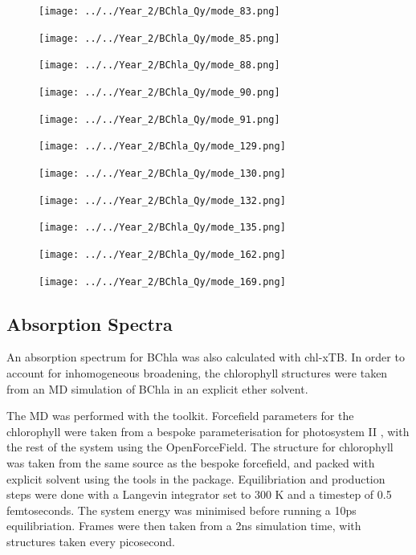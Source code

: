 \begin{figure}
    \texttt{[image: ../../Year\_2/BChla\_Qy/mode\_83.png]}
\end{figure}
\begin{figure}
    \texttt{[image: ../../Year\_2/BChla\_Qy/mode\_85.png]}
\end{figure}
\begin{figure}
    \texttt{[image: ../../Year\_2/BChla\_Qy/mode\_88.png]}
\end{figure}
\begin{figure}
    \texttt{[image: ../../Year\_2/BChla\_Qy/mode\_90.png]}
\end{figure}
\begin{figure}
    \texttt{[image: ../../Year\_2/BChla\_Qy/mode\_91.png]}
\end{figure}
\begin{figure}
    \texttt{[image: ../../Year\_2/BChla\_Qy/mode\_129.png]}
\end{figure}
\begin{figure}
    \texttt{[image: ../../Year\_2/BChla\_Qy/mode\_130.png]}
\end{figure}
\begin{figure}
    \texttt{[image: ../../Year\_2/BChla\_Qy/mode\_132.png]}
\end{figure}
\begin{figure}
    \texttt{[image: ../../Year\_2/BChla\_Qy/mode\_135.png]}
\end{figure}
\begin{figure}
    \texttt{[image: ../../Year\_2/BChla\_Qy/mode\_162.png]}
\end{figure}
\begin{figure}
    \texttt{[image: ../../Year\_2/BChla\_Qy/mode\_169.png]}
\end{figure}

\subsection{Absorption Spectra}
\label{subsec:absorption_spectra}

An absorption spectrum for BChla was also calculated with chl-xTB. In order to
account for inhomogeneous broadening, the chlorophyll structures were taken from
an MD simulation of BChla in an explicit ether solvent.

The MD was performed with the  toolkit. Forcefield parameters for the
chlorophyll were taken from a bespoke parameterisation for photosystem II \cite{Zhang2012},
with the rest of the system using the OpenForceField. The structure for chlorophyll 
was taken from the same source as the bespoke forcefield, and packed with explicit
solvent using the tools in the  package. Equilibriation and production
steps were done with a Langevin integrator set to 300 K  and a timestep of 0.5
femtoseconds. The system energy was minimised before running a 10ps equilibriation.
Frames were then taken from a 2ns simulation time, with structures taken every picosecond.

